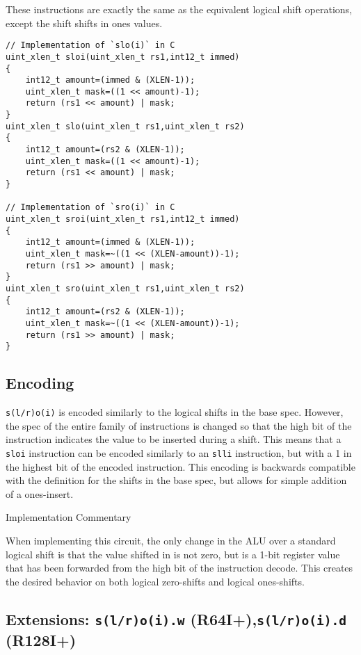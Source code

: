 These instructions are exactly the same as the equivalent logical shift
operations, except the shift shifts in ones values.

\begin{verbatim}
// Implementation of `slo(i)` in C
uint_xlen_t sloi(uint_xlen_t rs1,int12_t immed)
{
    int12_t amount=(immed & (XLEN-1));
    uint_xlen_t mask=((1 << amount)-1);
    return (rs1 << amount) | mask;
}
uint_xlen_t slo(uint_xlen_t rs1,uint_xlen_t rs2)
{
    int12_t amount=(rs2 & (XLEN-1));
    uint_xlen_t mask=((1 << amount)-1);
    return (rs1 << amount) | mask;
}

// Implementation of `sro(i)` in C
uint_xlen_t sroi(uint_xlen_t rs1,int12_t immed)
{
    int12_t amount=(immed & (XLEN-1));
    uint_xlen_t mask=~((1 << (XLEN-amount))-1);
    return (rs1 >> amount) | mask;
}
uint_xlen_t sro(uint_xlen_t rs1,uint_xlen_t rs2)
{
    int12_t amount=(rs2 & (XLEN-1));
    uint_xlen_t mask=~((1 << (XLEN-amount))-1);
    return (rs1 >> amount) | mask;
}
\end{verbatim}

\subsection{Encoding}



\texttt{s(l/r)o(i)} is encoded similarly to the logical shifts in the
base spec. However, the spec of the entire family of instructions is
changed so that the high bit of the instruction indicates the value to
be inserted during a shift. This means that a \texttt{sloi} instruction
can be encoded similarly to an \texttt{slli} instruction, but with a 1
in the highest bit of the encoded instruction. This encoding is
backwards compatible with the definition for the shifts in the base
spec, but allows for simple addition of a ones-insert.

Implementation Commentary

When implementing this circuit, the only change in the ALU over a
standard logical shift is that the value shifted in is not zero, but is
a 1-bit register value that has been forwarded from the high bit of the
instruction decode. This creates the desired behavior on both logical
zero-shifts and logical ones-shifts.

\subsection{Extensions: \texttt{s(l/r)o(i).w} (R64I+),\texttt{s(l/r)o(i).d} (R128I+)}

